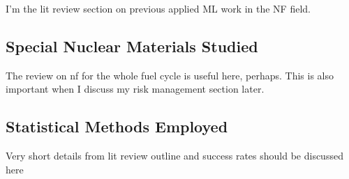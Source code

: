 I'm the lit review section on previous applied ML work in the NF field.

\subsection{Special Nuclear Materials Studied}

The review on nf for the whole fuel cycle is useful here, perhaps. This is also 
important when I discuss my risk management section later. 

\subsection{Statistical Methods Employed}

Very short details from lit review outline and success rates should be 
discussed here

